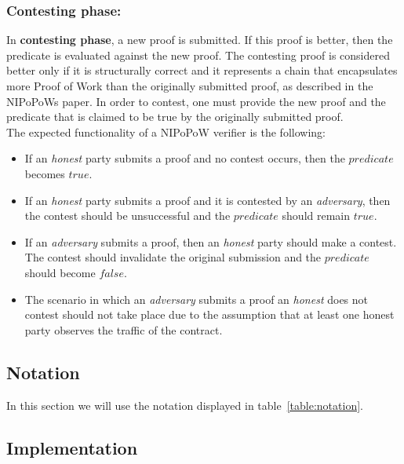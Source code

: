\subsubsection{Contesting phase:} In \textbf{contesting phase}, a new proof is
submitted. If this proof is better, then the predicate is evaluated against the
new proof. The contesting proof is considered better only if it is structurally
correct and it represents a chain that encapsulates more Proof of Work than the
originally submitted proof, as described in the NIPoPoWs paper.  In order to
contest, one must provide the new proof and the predicate that is claimed to be
true by the originally submitted proof.\\

The expected functionality of a NIPoPoW verifier is the following:
\begin{itemize}

    \item
        If an \textit{honest} party submits a proof and no contest occurs, then
        the $predicate$ becomes $true$.

    \item
        If an \textit{honest} party submits a proof and it is contested by an
        \textit{adversary}, then the contest should be unsuccessful and the
        $predicate$ should remain $true$.

    \item
        If an \textit{adversary} submits a proof, then an \textit{honest} party
        should make a contest. The contest should invalidate the original
        submission and the $predicate$ should become $false$.

    \item
        The scenario in which an \textit{adversary} submits a proof an
        \textit{honest} does not contest should not take place due to the
        assumption that at least one honest party observes the traffic of the
        contract.

\end{itemize}

\subsection{Notation}

In this section we will use the notation displayed in
table~\ref{table:notation}.



\subsection{Implementation}

